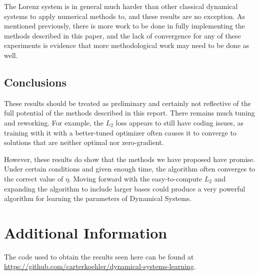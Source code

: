 \documentclass[12pt]{article}
\begin{document}
The Lorenz system is in general much harder than other classical dynamical systems to apply numerical methods to, and these results are no exception. As mentioned previously, there is more work to be done in fully implementing the methods described in this paper, and the lack of convergence for any of these experiments is evidence that more methodological work may need to be done as well.



\subsection{Conclusions}

These results should be treated as preliminary and certainly not reflective of the full potential of the methods described in this report. There remains much tuning and reworking. For example, the $L_2$ loss appears to still have coding issues, as training with it with a better-tuned optimizer often causes it to converge to solutions that are neither optimal nor zero-gradient.

However, these results do show that the methods we have proposed have promise. Under certain conditions and given enough time, the algorithm often converges to the correct value of $\eta$. Moving forward with the easy-to-compute $L_2$ and expanding the algorithm to include larger bases could produce a very powerful algorithm for learning the parameters of Dynamical Systems.


\section{Additional Information}

The code used to obtain the results seen here can be found at \url{https://github.com/carterkoehler/dynamical-systems-learning}.







\end{document}
